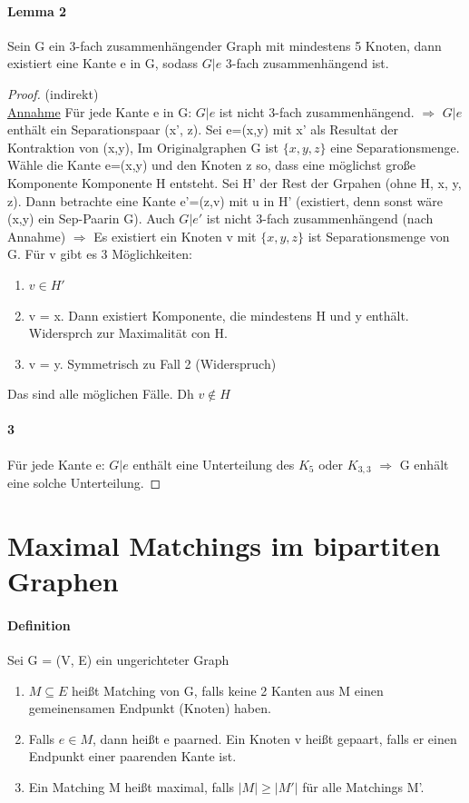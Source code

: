 \paragraph{Lemma 2} Sein G ein 3-fach zusammenhängender Graph mit mindestens 5 Knoten, dann existiert eine Kante e in G, sodass $ G|e $ 3-fach zusammenhängend ist.

\begin{proof}(indirekt) \\
\underline{Annahme} Für jede Kante e in G: $ G|e $ ist nicht 3-fach zusammenhängend. $ \Rightarrow $ $ G|e $ enthält ein Separationspaar (x', z). Sei e=(x,y) mit x' als Resultat der Kontraktion von (x,y), Im Originalgraphen G ist $ \{x,y,z \} $ eine Separationsmenge. Wähle die Kante e=(x,y) und den Knoten z so, dass eine möglichst große Komponente Komponente H entsteht. Sei H' der Rest der Grpahen (ohne H, x, y, z). Dann betrachte eine Kante e'=(z,v) mit u in H' (existiert, denn sonst wäre (x,y) ein Sep-Paarin G). Auch $ G|e' $ ist nicht 3-fach zusammenhängend (nach Annahme) $ \Rightarrow $ Es existiert ein Knoten v mit  $ \{x,y,z \} $ ist Separationsmenge von G. Für v gibt es 3 Möglichkeiten:
\begin{enumerate}
    \item $ v \in H' $
    \item v = x. Dann existiert Komponente, die mindestens H und y enthält. Widersprch zur Maximalität con H.
    \item v = y. Symmetrisch zu Fall 2 (Widerspruch)
\end{enumerate}
Das sind alle möglichen Fälle. Dh $ v \notin H $

\paragraph{3} Für jede Kante e: $ G|e $ enthält eine Unterteilung des $ K_5 $ oder $ K_{3,3} $ $ \Rightarrow $ G enhält eine solche Unterteilung. 

\end{proof}

\section{Maximal Matchings im bipartiten Graphen}

\paragraph{Definition} Sei G = (V, E) ein ungerichteter Graph
\begin{enumerate}
    \item $ M \subseteq E $ heißt Matching von G, falls keine 2 Kanten aus M einen gemeinensamen Endpunkt (Knoten) haben.
    \item Falls $ e \in M $, dann heißt e paarned. Ein Knoten v heißt gepaart, falls er einen Endpunkt einer paarenden Kante ist.
    \item Ein Matching M heißt maximal, falls $ |M| \geq |M'| $ für alle Matchings M'. 
\end{enumerate}

